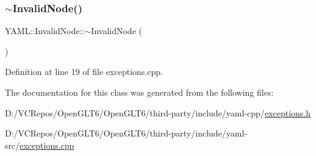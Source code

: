 \subsubsection{\texorpdfstring{$\sim$InvalidNode()}{~InvalidNode()}}
{\footnotesize\ttfamily Y\+A\+M\+L\+::\+Invalid\+Node\+::$\sim$\+Invalid\+Node (\begin{DoxyParamCaption}{ }\end{DoxyParamCaption})\hspace{0.3cm}{\ttfamily [virtual]}}



Definition at line 19 of file exceptions.\+cpp.



The documentation for this class was generated from the following files\+:\begin{DoxyCompactItemize}
\item 
D\+:/\+V\+C\+Repos/\+Open\+G\+L\+T6/\+Open\+G\+L\+T6/third-\/party/include/yaml-\/cpp/\mbox{\hyperlink{exceptions_8h}{exceptions.\+h}}\item 
D\+:/\+V\+C\+Repos/\+Open\+G\+L\+T6/\+Open\+G\+L\+T6/third-\/party/include/yaml-\/src/\mbox{\hyperlink{exceptions_8cpp}{exceptions.\+cpp}}\end{DoxyCompactItemize}
